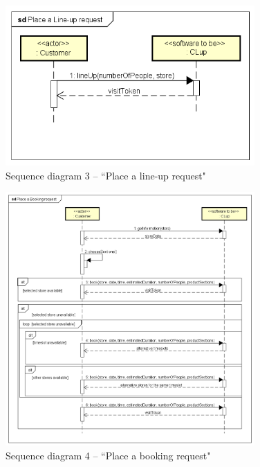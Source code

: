 \documentclass[a4paper,oneside,11pt]{book}   %
\begin{document}
    \begin{figure}[H]
        \centering
        \includegraphics[width=0.85\textwidth, keepaspectratio]{pictures/sequence_diagrams/place_line-up_request}
        \caption{Sequence diagram 3 -- ``Place a line-up request"}
        \label{figure:sequence_diagram_3_place_lineup_request}
    \end{figure}
    
    \begin{figure}[H]
        \centering
        \includegraphics[width=0.85\textwidth, keepaspectratio]{pictures/sequence_diagrams/place_booking_request}
        \caption{Sequence diagram 4 -- ``Place a booking request"}
        \label{figure:sequence_diagram_4_place_booking_request}
    \end{figure}
\end{document}
